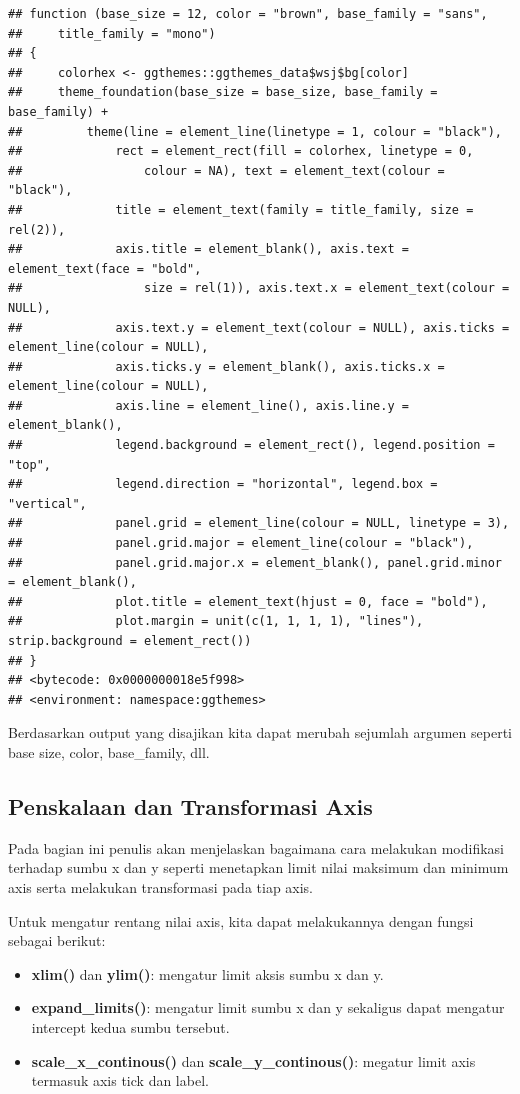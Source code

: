 \documentclass[]{book}
\providecommand{\tightlist}{%
  \setlength{\itemsep}{0pt}\setlength{\parskip}{0pt}}
\begin{document}
\begin{verbatim}
## function (base_size = 12, color = "brown", base_family = "sans", 
##     title_family = "mono") 
## {
##     colorhex <- ggthemes::ggthemes_data$wsj$bg[color]
##     theme_foundation(base_size = base_size, base_family = base_family) + 
##         theme(line = element_line(linetype = 1, colour = "black"), 
##             rect = element_rect(fill = colorhex, linetype = 0, 
##                 colour = NA), text = element_text(colour = "black"), 
##             title = element_text(family = title_family, size = rel(2)), 
##             axis.title = element_blank(), axis.text = element_text(face = "bold", 
##                 size = rel(1)), axis.text.x = element_text(colour = NULL), 
##             axis.text.y = element_text(colour = NULL), axis.ticks = element_line(colour = NULL), 
##             axis.ticks.y = element_blank(), axis.ticks.x = element_line(colour = NULL), 
##             axis.line = element_line(), axis.line.y = element_blank(), 
##             legend.background = element_rect(), legend.position = "top", 
##             legend.direction = "horizontal", legend.box = "vertical", 
##             panel.grid = element_line(colour = NULL, linetype = 3), 
##             panel.grid.major = element_line(colour = "black"), 
##             panel.grid.major.x = element_blank(), panel.grid.minor = element_blank(), 
##             plot.title = element_text(hjust = 0, face = "bold"), 
##             plot.margin = unit(c(1, 1, 1, 1), "lines"), strip.background = element_rect())
## }
## <bytecode: 0x0000000018e5f998>
## <environment: namespace:ggthemes>
\end{verbatim}

Berdasarkan output yang disajikan kita dapat merubah sejumlah argumen
seperti base size, color, base\_family, dll.

\subsection{Penskalaan dan Transformasi
Axis}\label{penskalaan-dan-transformasi-axis}

Pada bagian ini penulis akan menjelaskan bagaimana cara melakukan
modifikasi terhadap sumbu x dan y seperti menetapkan limit nilai
maksimum dan minimum axis serta melakukan transformasi pada tiap axis.

Untuk mengatur rentang nilai axis, kita dapat melakukannya dengan fungsi
sebagai berikut:

\begin{itemize}
\tightlist
\item
  \textbf{xlim()} dan \textbf{ylim()}: mengatur limit aksis sumbu x dan
  y.
\item
  \textbf{expand\_limits()}: mengatur limit sumbu x dan y sekaligus
  dapat mengatur intercept kedua sumbu tersebut.
\item
  \textbf{scale\_x\_continous()} dan \textbf{scale\_y\_continous()}:
  megatur limit axis termasuk axis tick dan label.
\end{itemize}
\end{document}
